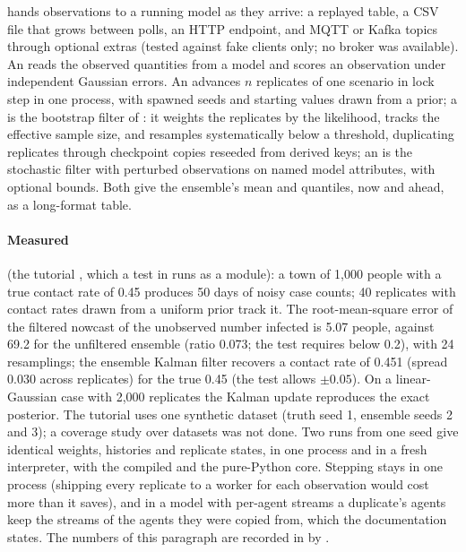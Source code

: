  hands observations to a running model as they arrive: a replayed table,
a CSV file that grows between polls, an HTTP endpoint, and MQTT or Kafka topics through
optional extras (tested against fake clients only; no broker was available). An
 reads the observed quantities from a model and scores an
observation under independent Gaussian errors. An  advances $n$ replicates of
one scenario in lock step in one process, with spawned seeds and starting values drawn from a
prior; a  is the bootstrap filter of \citet{gordon1993novel}: it weights
the replicates by the likelihood, tracks the effective sample size, and resamples
systematically \citep{douc2005comparison} below a threshold, duplicating replicates through
checkpoint copies reseeded from derived keys; an  is the
stochastic filter with perturbed observations \citep{evensen1994sequential, evensen2003ensemble}
on named model attributes, with optional bounds. Both give the ensemble's mean and quantiles,
now and ahead, as a long-format table.

\paragraph{Measured} (the tutorial , which a test in
 runs as a module): a town of 1,000 people with a true
contact rate of 0.45 produces 50 days of noisy case counts; 40 replicates with contact rates
drawn from a uniform prior track it. The root-mean-square error of the filtered nowcast of the
unobserved number infected is 5.07 people, against 69.2 for the unfiltered ensemble (ratio
0.073; the test requires below 0.2), with 24 resamplings; the ensemble Kalman filter
recovers a contact rate of 0.451 (spread 0.030 across replicates) for the true 0.45 (the test
allows $\pm 0.05$). On a linear-Gaussian case with 2,000 replicates the Kalman update
reproduces the exact posterior. The tutorial uses one synthetic dataset (truth seed 1,
ensemble seeds 2 and 3); a coverage study over datasets was not done. Two runs from one seed
give identical weights, histories and
replicate states, in one process and in a fresh interpreter, with the compiled and the
pure-Python core. Stepping stays in one process (shipping every replicate to a worker for each
observation would cost more than it saves), and in a model with per-agent streams a
duplicate's agents keep the streams of the agents they were copied from, which the
documentation states. The numbers of this paragraph are recorded in
 by .

